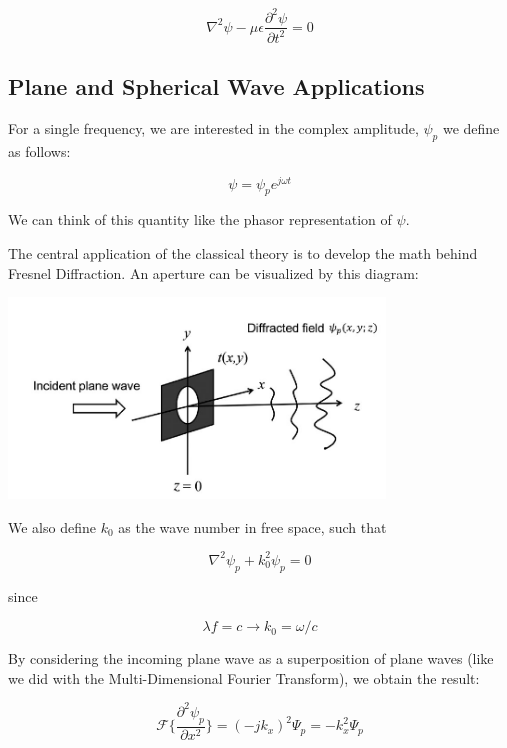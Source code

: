 \documentclass{article}
\begin{document}
\begin{equation}
	\nabla^2\psi - \mu\epsilon\frac{\partial^2\psi}{\partial t^2} = 0
\end{equation}

\subsection{Plane and Spherical Wave Applications}

For a single frequency, we are interested in the complex amplitude, \(\psi_{p}\) we define as follows:

\begin{equation}
	\psi = \psi_{p}e^{j \omega t}
\end{equation}

We can think of this quantity like the phasor representation of \(\psi\).

The central application of the classical theory is to develop the math behind Fresnel Diffraction. An aperture can be visualized by this diagram:
\begin{center}
\includegraphics[width=100mm]{tupac5.png}
\end{center}

We also define \(k_{0}\) as the wave number in free space, such that

\begin{equation}
	\nabla^2\psi_{p} + k_{0}^2\psi_{p} = 0
\end{equation}

since

\begin{equation}
	\lambda f = c \rightarrow k_{0} = \omega/c
\end{equation}

By considering the incoming plane wave as a superposition of plane waves (like we did with the Multi-Dimensional Fourier Transform), we obtain the result:

\begin{equation}
	\mathscr{F} \Big\{ \frac{\partial^2 \psi_{p}}{\partial x^2} \Big\} = (-jk_{x})^2\Psi_{p} = -k_{x}^2\Psi_{p}
\end{equation}
\end{document}

